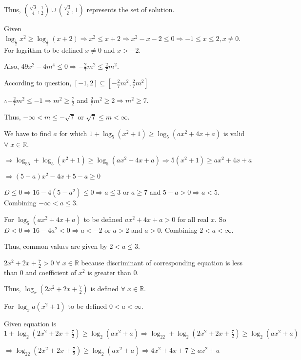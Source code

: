   Thus, $\left(\frac{\sqrt{3}}{4}, \frac{1}{2}\right)\cup\left(\frac{\sqrt{3}}{2}, 1\right)$ represents the
  set of solution.
\item Given $\log_{\tfrac{1}{2}}x^2 \geq \log_{\tfrac{1}{2}}(x + 2)\Rightarrow x^2\leq x + 2 \Rightarrow x^2
  - x - 2\leq 0 \Rightarrow -1 \leq x\leq 2, x\neq 0$. For lagrithm to be defined $x\neq 0$ and $x > -2$.

  Also, $49x^2 - 4m^4 \leq 0 \Rightarrow -\frac{2}{7}m^2\leq \frac{2}{7}m^2$.

  According to question, $[-1, 2]\subseteq \left[-\frac{2}{7}m^2, \frac{2}{7}m^2\right]$

  $\therefore -\frac{2}{7}m^2\leq -1 \Rightarrow m^2\geq \frac{7}{2}$ and $\frac{2}{7}m^2\geq 2 \Rightarrow
  m^2\geq 7$.

  Thus, $-\infty < m \leq -\sqrt{7}$ or $\sqrt{7}\leq m < \infty$.
\item We have to find $a$ for which $1 + \log_5(x^2 + 1) \geq \log_5(ax^2 + 4x + a)$ is valid
  $\forall\;x\in\mathbb{R}$.

  $\Rightarrow \log_55 + \log_5(x^2 + 1) \geq \log_5(ax^2 + 4x + a) \Rightarrow 5(x^2 + 1)\geq ax^2 + 4x +
  a$

  $\Rightarrow (5 - a)x^2 - 4x + 5 - a \geq 0$

  $D\leq 0 \Rightarrow 16 - 4(5 - a^2)\leq 0\Rightarrow a\leq 3$ or $a\geq 7$ and $5 - a > 0\Rightarrow a <
  5$. Combining $-\infty < a\leq 3$.

  For $\log_5(ax^2 + 4x + a)$ to be defined $ax^2 + 4x + a > 0$ for all real $x$. So $D < 0 \Rightarrow 16 -
  4a^2 < 0 \Rightarrow a < -2$ or $a > 2$ and $a > 0$. Combining $2 < a < \infty$.

  Thus, common values are given by $2 < a \leq 3$.
\item $2x^2 + 2x + \frac{7}{2} > 0\;\forall\;x\in\mathbb{R}$ because discriminant of corresponding equation
  is less than $0$ and coefficient of $x^2$ is greater than $0$.

  Thus, $\log_x\left(2x^2 + 2x + \frac{7}{2}\right)$ is defined $\forall\;x\in\mathbb{R}$.

  For $\log_xa(x^2 + 1)$ to be defined $0 < a < \infty$.

  Given equation is $1 + \log_2\left(2x^2 + 2x + \frac{7}{2}\right)\geq \log_2(ax^2 + a) \Rightarrow \log_22
  + \log_2\left(2x^2 + 2x + \frac{7}{2}\right)\geq \log_2(ax^2 + a)$

  $\Rightarrow \log_22\left(2x^2 + 2x + \frac{7}{2}\right)\geq \log_2(ax^2 + a)\Rightarrow 4x^2 + 4x + 7\geq
  ax^2 + a$

